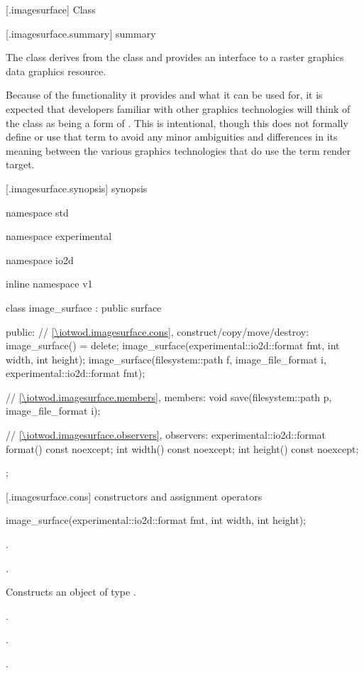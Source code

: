  [\iotwod.imagesurface] {Class }

 [\iotwod.imagesurface.summary] { summary}

\pnum
{}
The class  derives from the  class and provides an interface to a raster graphics data graphics resource.

\pnum
\begin{note}
Because of the functionality it provides and what it can be used for, it is expected that developers familiar with other graphics technologies will think of the  class as being a form of . This is intentional, though this \documenttypename{} does not formally define or use that term to avoid any minor ambiguities and differences in its meaning between the various graphics technologies that do use the term render target.
\end{note}

 [\iotwod.imagesurface.synopsis] { synopsis}

\begin{codeblock}
namespace std { namespace experimental { namespace io2d { inline namespace v1 {
  class image_surface : public surface {
  public:
    // \ref{\iotwod.imagesurface.cons}, construct/copy/move/destroy:
    image_surface() = delete;
    image_surface(experimental::io2d::format fmt, int width, int height);
    image_surface(filesystem::path f, image_file_format i, 
      experimental::io2d::format fmt);
    
    // \ref{\iotwod.imagesurface.members}, members:
    void save(filesystem::path p, image_file_format i);
    
    // \ref{\iotwod.imagesurface.observers}, observers:
    experimental::io2d::format format() const noexcept;
    int width() const noexcept;
    int height() const noexcept;
  };
} } } }
\end{codeblock}

 [\iotwod.imagesurface.cons] { constructors and assignment operators}

\begin{itemdecl}
image_surface(experimental::io2d::format fmt, int width, int height);
\end{itemdecl}
\begin{itemdescr}
\pnum
\requires
{}.

\pnum
{}.

\pnum
\effects
Constructs an object of type .

\pnum
\postconditions
{}.

\pnum
{}.

\pnum
{}.
\end{itemdescr}

